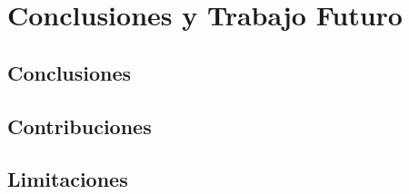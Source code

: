 
\section{Conclusiones y Trabajo Futuro}
\label{sec:conclusiones}


\subsection{Conclusiones}
\label{subsec:conclusiones}


\subsection{Contribuciones}
\label{subsec:contribuciones}


\subsection{Limitaciones}
\label{subsec:limitaciones}

